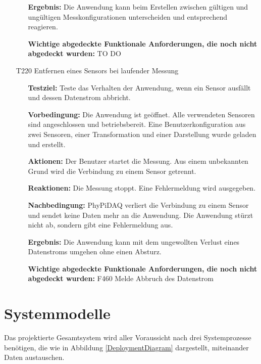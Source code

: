 \documentclass[parskip=full]{scrartcl}
\begin{document}
\begin{itemize}
\begin{itemize}
\item []\textbf{Ergebnis:} Die Anwendung kann beim Erstellen zwischen gültigen und ungültigen Messkonfigurationen unterscheiden und entsprechend reagieren.
\item []\textbf{Wichtige abgedeckte Funktionale Anforderungen, die noch nicht abgedeckt wurden:} TO DO

\end{itemize}

\item[T220] Entfernen eines Sensors bei laufender Messung
\begin{itemize}

\item []\textbf{Testziel:} Teste das Verhalten der Anwendung, wenn ein Sensor ausfällt und dessen Datenstrom abbricht.

\item []\textbf{Vorbedingung:} Die Anwendung ist geöffnet. Alle verwendeten Sensoren sind angeschlossen und betriebsbereit. Eine Benutzerkonfiguration aus zwei Sensoren, einer Transformation und einer Darstellung wurde geladen und erstellt.
\item []\textbf{Aktionen:} Der Benutzer startet die Messung. Aus einem unbekannten Grund wird die Verbindung zu einem Sensor getrennt.
\item []\textbf{Reaktionen:} Die Messung stoppt. Eine Fehlermeldung wird ausgegeben.
\item []\textbf{Nachbedingung:} \gls{PhyPiDAQ} verliert die Verbindung zu einem Sensor und sendet keine Daten mehr an die Anwendung. Die Anwendung stürzt nicht ab, sondern gibt eine Fehlermeldung aus.

\item []\textbf{Ergebnis:} Die Anwendung kann mit dem ungewollten Verlust eines Datenstroms umgehen ohne einen Absturz.
\item []\textbf{Wichtige abgedeckte Funktionale Anforderungen, die noch nicht abgedeckt wurden:} F460 Melde Abbruch des Datenstrom

\end{itemize}


\end{itemize}


\section{Systemmodelle}\label{systemmodell}

Das projektierte Gesamtsystem wird aller Voraussicht nach drei Systemprozesse benötigen, die wie in Abbildung \ref{DeploymentDiagram} dargestellt, miteinander Daten austauschen.
\end{document}

